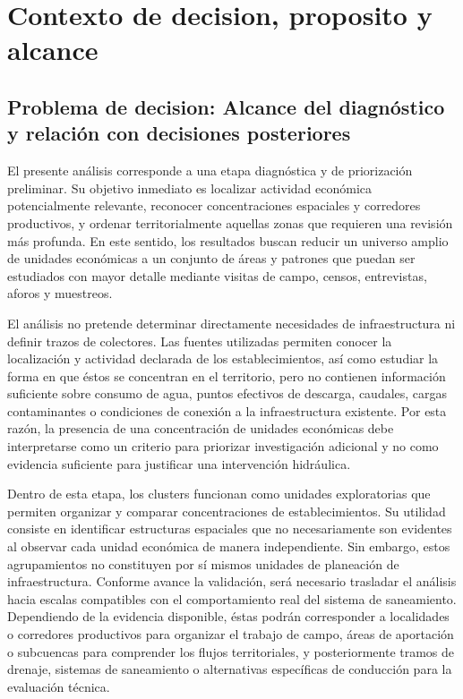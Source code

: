 \documentclass[11pt,letterpaper]{article}
\begin{document}
\section{Contexto de decision, proposito y alcance}

\subsection{Problema de decision: Alcance del diagnóstico y relación con decisiones posteriores}

El presente análisis corresponde a una etapa diagnóstica y de priorización preliminar. Su objetivo inmediato es localizar actividad económica potencialmente relevante, reconocer concentraciones espaciales y corredores productivos, y ordenar territorialmente aquellas zonas que requieren una revisión más profunda. En este sentido, los resultados buscan reducir un universo amplio de unidades económicas a un conjunto de áreas y patrones que puedan ser estudiados con mayor detalle mediante visitas de campo, censos, entrevistas, aforos y muestreos.

El análisis no pretende determinar directamente necesidades de infraestructura ni definir trazos de colectores. Las fuentes utilizadas permiten conocer la localización y actividad declarada de los establecimientos, así como estudiar la forma en que éstos se concentran en el territorio, pero no contienen información suficiente sobre consumo de agua, puntos efectivos de descarga, caudales, cargas contaminantes o condiciones de conexión a la infraestructura existente. Por esta razón, la presencia de una concentración de unidades económicas debe interpretarse como un criterio para priorizar investigación adicional y no como evidencia suficiente para justificar una intervención hidráulica.

Dentro de esta etapa, los clusters funcionan como unidades exploratorias que permiten organizar y comparar concentraciones de establecimientos. Su utilidad consiste en identificar estructuras espaciales que no necesariamente son evidentes al observar cada unidad económica de manera independiente. Sin embargo, estos agrupamientos no constituyen por sí mismos unidades de planeación de infraestructura. Conforme avance la validación, será necesario trasladar el análisis hacia escalas compatibles con el comportamiento real del sistema de saneamiento. Dependiendo de la evidencia disponible, éstas podrán corresponder a localidades o corredores productivos para organizar el trabajo de campo, áreas de aportación o subcuencas para comprender los flujos territoriales, y posteriormente tramos de drenaje, sistemas de saneamiento o alternativas específicas de conducción para la evaluación técnica.
\end{document}
